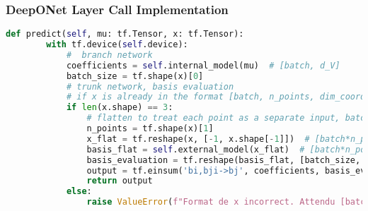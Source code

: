 \documentclass[aspectratio=169]{beamer}
\begin{document}
    
    \begin{frame}[fragile]
    \frametitle{DeepONet Layer Call Implementation}
    
    \begin{lstlisting}[language=Python]
    def predict(self, mu: tf.Tensor, x: tf.Tensor):
        with tf.device(self.device):
            #  branch network
            coefficients = self.internal_model(mu)  # [batch, d_V]
            batch_size = tf.shape(x)[0]
            # trunk network, basis evaluation
            # if x is already in the format [batch, n_points, dim_coords], treat it directly
            if len(x.shape) == 3:
                # flatten to treat each point as a separate input, batch differenciation is unuseful
                n_points = tf.shape(x)[1]
                x_flat = tf.reshape(x, [-1, x.shape[-1]])  # [batch*n_points, dim_coords]
                basis_flat = self.external_model(x_flat)  # [batch*n_points, d_V], to be fed to the external               
                basis_evaluation = tf.reshape(basis_flat, [batch_size, n_points, -1])  # [batch, n_points, d_V]
                output = tf.einsum('bi,bji->bj', coefficients, basis_evaluation)  # tensor contraction [batch, n_points]
                return output
            else:
                raise ValueError(f"Format de x incorrect. Attendu [batch, n_points, dim_coords], reçu {x.shape}")
    \end{lstlisting}
    
    \end{frame}
    
    
\end{document}
